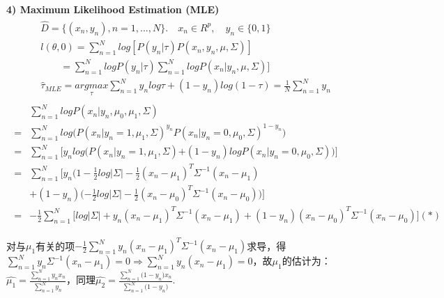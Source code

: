 \documentclass[12pt,UTF8,AutoFakeBold]{article}
\begin{document}
\textbf{4) Maximum Likelihood Estimation (MLE)}
\begin{gather}
\begin{aligned}
& \hat { D } =\{ ({ x }_{ n },{ y }_{ n }),n=1,...,N\} .\quad { x }_{ n }\in { R }^{ p },\quad { y }_{ n }\in \{ 0,1\} \\
& l(\theta ,0)=\sum _{ n=1 }^{ N }{ log[P({ y }_{ n }|\tau )P({ x }_{ n },{ y }_{ n },\mu ,\Sigma )] } \\ 
& \quad \quad=\sum _{ n=1 }^{ N }{ logP({ y }_{ n }|\tau ) } \sum _{ n=1 }^{ N }{ logP({ x }_{ n }|{ y }_{ n },\mu ,\Sigma )] }\\
& { \hat { \tau  }  }_{ MLE }=\underset { \tau  }{ argmax } \sum _{ n=1 }^{ N }{ { y }_{ n }log\tau +(1-{ y }_{ n })log(1-\tau ) } =\frac { 1 }{ N } \sum _{ n=1 }^{ N }{ { y }_{ n } } 
\end{aligned}
\end{gather}
\begin{gather}
\begin{aligned}
& \sum _{ n=1 }^{ N }{ logP({ x }_{ n }|{ y }_{ n },{ \mu  }_{ 0 },{ \mu  }_{ 1 },\Sigma ) } \\ 
= & \sum _{ n=1 }^{ N }{ log{ (P({ x }_{ n }|{ y }_{ n }=1,{ \mu  }_{ 1 },\Sigma ) }^{ { y }_{ n } } } { P({ x }_{ n }|{ y }_{ n }=0,{ \mu  }_{ 0 },\Sigma ) }^{ 1-{ y }_{ n } })\\ 
= & \sum _{ n=1 }^{ N }{ [{ y }_{ n }{ log(P({ x }_{ n }|{ y }_{ n }=1,{ \mu  }_{ 1 },\Sigma ) } } { +(1-{ y }_{ n })logP({ x }_{ n }|{ y }_{ n }=0,{ \mu  }_{ 0 },\Sigma ) })]\\ 
= & \sum _{ n=1 }^{ N }{ [{ y }_{ n }{ (1-\frac { 1 }{ 2 } log\left| \Sigma  \right| -\frac { 1 }{ 2 } { ({ x }_{ n }-{ \mu  }_{ 1 }) }^{ T }{ \Sigma  }^{ -1 }{ ({ x }_{ n }-{ \mu  }_{ 1 }) } } } \\
& { +(1-{ y }_{ n })(-\frac { 1 }{ 2 } log\left| \Sigma  \right| -\frac { 1 }{ 2 } { ({ x }_{ n }-{ \mu  }_{ 0 }) }^{ T }{ \Sigma  }^{ -1 }{ ({ x }_{ n }-{ \mu  }_{ 0 }) } })]\\ 
= & -\frac { 1 }{ 2 } \sum _{ n=1 }^{ N }{ [{ log\left| \Sigma  \right| +{ y }_{ n }{ ({ x }_{ n }-{ \mu  }_{ 1 }) }^{ T }{ \Sigma  }^{ -1 }{ ({ x }_{ n }-{ \mu  }_{ 1 }) } } } +(1-{ y }_{ n }){ ({ x }_{ n }-{ \mu  }_{ 0 }) }^{ T }{ \Sigma  }^{ -1 }{ ({ x }_{ n }-{ \mu  }_{ 0 }) }](*)
\end{aligned}
\end{gather}

对与$\mu_1$有关的项$-\frac { 1 }{ 2 } \sum _{ n=1 }^{ N }{ { { y }_{ n }{ ({ x }_{ n }-{ \mu  }_{ 1 }) }^{ T }{ \Sigma  }^{ -1 }{ ({ x }_{ n }-{ \mu  }_{ 1 }) } } } $求导，得$\sum _{ n=1 }^{ N }{ { { { y }_{ n } }{ \Sigma  }^{ -1 }{ ({ x }_{ n }-{ \mu  }_{ 1 }) } } } =0\Rightarrow \sum _{ n=1 }^{ N }{ { { { y }_{ n } }{ ({ x }_{ n }-{ \mu  }_{ 1 }) } } } =0$，故$\mu_1$的估计为：$\hat { { \mu  }_{ 1 } } =\frac { \sum _{ n=1 }^{ N }{ { y }_{ n }{ x }_{ n } }  }{ \sum _{ n=1 }^{ N }{ { y }_{ n } }  } $，同理$\hat { { \mu  }_{ 2 } } =\frac { \sum _{ n=1 }^{ N }{ { (1-y }_{ n }){ x }_{ n } }  }{ \sum _{ n=1 }^{ N }{ { (1-y }_{ n }) }  } $.
\end{document}
